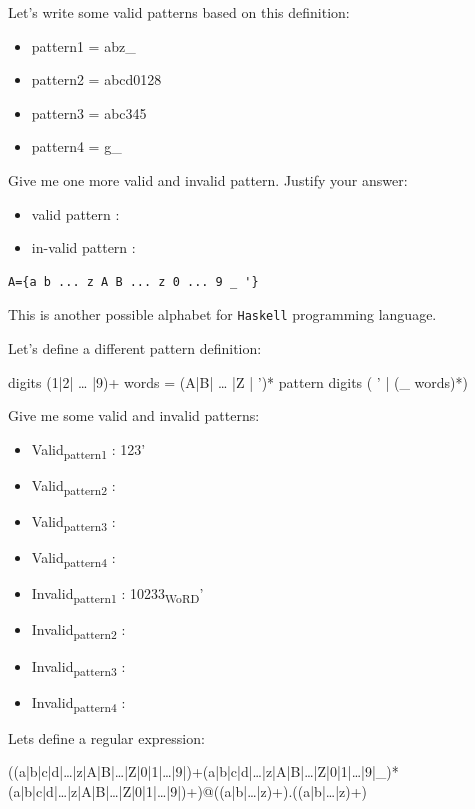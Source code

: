 \documentclass[11pt]{article}
\begin{document}
Let's write some valid patterns based on this definition:

\begin{itemize}
\item pattern1 = abz\_
\item pattern2 = abcd0128
\item pattern3 = abc345
\item pattern4 = g\_
\end{itemize}

Give me one more valid and invalid pattern. Justify your answer:

\begin{itemize}
\item valid pattern :
\item in-valid pattern :
\end{itemize}


\begin{verbatim}
A={a b ... z A B ... z 0 ... 9 _ '}
\end{verbatim}

This is another possible alphabet for \texttt{Haskell} programming language.

Let's define a different pattern definition:

digits (1|2| \ldots{} |9)+
words = (A|B| \ldots{} |Z | ')*
pattern digits ( ' | (\_ words)*)

Give me some valid and invalid patterns:

\begin{itemize}
\item Valid\textsubscript{pattern1} : 123'
\item Valid\textsubscript{pattern2} :
\item Valid\textsubscript{pattern3} :
\item Valid\textsubscript{pattern4} :

\item Invalid\textsubscript{pattern1} : 10233\textsubscript{WoRD}'
\item Invalid\textsubscript{pattern2} :
\item Invalid\textsubscript{pattern3} :
\item Invalid\textsubscript{pattern4} :
\end{itemize}

Lets define a regular expression:

((a|b|c|d|\ldots{}|z|A|B|\ldots{}|Z|0|1|\ldots{}|9|)+(a|b|c|d|\ldots{}|z|A|B|\ldots{}|Z|0|1|\ldots{}|9|\_)*(a|b|c|d|\ldots{}|z|A|B|\ldots{}|Z|0|1|\ldots{}|9|)+)@((a|b|\ldots{}|z)+).((a|b|\ldots{}|z)+)
\end{document}
